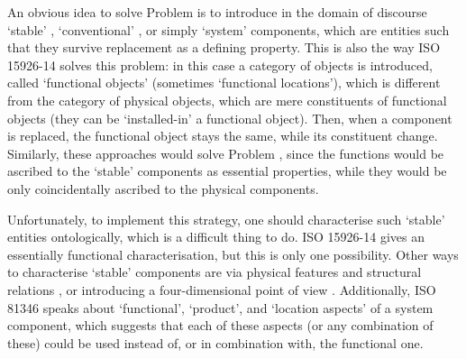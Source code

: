 \documentclass[
]{ceurart}
\begin{document}
An obvious idea to solve Problem  is to introduce in the domain of discourse `stable' \cite{compagnoComparingOntologicalAlternatives2021}, `conventional' \cite{guarinoArtefactualSystemsMissing2014}, or simply `system' \cite{westDevelopingHighQuality2011} components, which are entities such that they survive replacement as a defining property.   
This is also the way ISO 15926-14 \cite{kluwerISO159261420202020} solves this problem: in this case a category of objects is introduced, called `functional objects' (sometimes `functional locations'), which is different from the category of physical objects, which are mere constituents of functional objects (they can be `installed-in' a functional object). Then, when a component is replaced, the functional object stays the same, while its constituent change. Similarly, these approaches would solve Problem , since the functions would be ascribed to the `stable' components as essential properties, while they would be only coincidentally ascribed to the physical components. 

Unfortunately, to implement this strategy, one should characterise such `stable' entities ontologically, which is a difficult thing to do.
ISO 15926-14 gives an essentially functional characterisation, but this is only one possibility. Other ways to characterise `stable' components are via physical features and structural relations \cite{compagnoComparingOntologicalAlternatives2021}, %
or introducing a four-dimensional point of view \cite{westDevelopingHighQuality2011}. Additionally, ISO 81346 \cite{ISOIEC8134612009} speaks about `functional', `product', and `location aspects' of a system component, which suggests that each of these aspects (or any combination of these) could be used instead of, or in combination with, the functional one.
\end{document}
